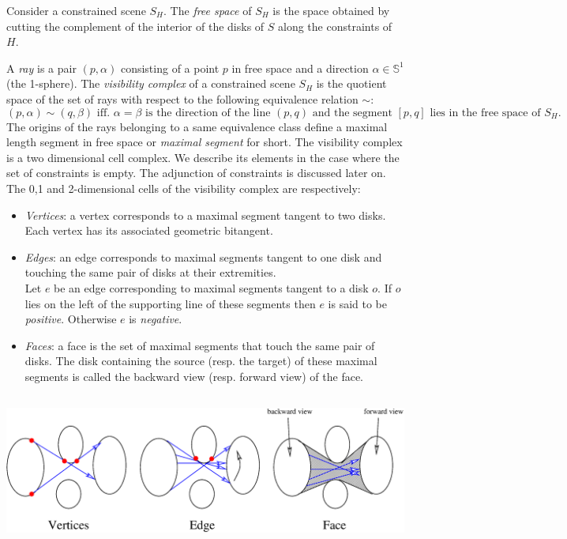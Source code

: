 Consider a constrained scene $S_H$. The \emph{free space} of $S_H$ is the
space obtained by cutting the complement of the interior of the disks of $S$
along the constraints of $H$.

A \emph{ray} is a pair $(p,\alpha)$ consisting of a point $p$ in free space and
a direction $\alpha \in \mathbb{S}^1$ (the 1-sphere).  The \emph{visibility
complex} of a constrained scene $S_H$ is the quotient space of the set of rays
with respect to the following equivalence relation $\sim$:
\begin{equation}
(p,\alpha) \sim (q,\beta) \textrm{ iff. } \alpha = \beta \textrm{ is the
direction of the line $(p,q)$ and the segment } [p,q] \textrm{ lies in the free
space of } S_H.
\end{equation}
The origins of the rays belonging to a same equivalence class define a maximal
length segment in free space or \emph{maximal segment} for short.  The
visibility complex is a two dimensional cell complex. We describe its elements
in the case where the set of constraints is empty. The adjunction of constraints
is discussed later on. The 0,1 and 2-dimensional cells of the visibility complex
are respectively:
\begin{itemize}
    \item \emph{Vertices}: a vertex corresponds to a maximal segment tangent to
    two disks. Each vertex has its associated geometric bitangent.
    \item \emph{Edges}: an edge corresponds to maximal segments tangent to one
    disk and touching the same pair of disks at their extremities. \\
    Let $e$ be an edge corresponding to maximal segments tangent to a disk $o$.
    If $o$ lies on the left of the supporting line of these segments then $e$ is
    said to be \emph{positive}. Otherwise $e$ is \emph{negative}.
    \item \emph{Faces}: a face is the set of maximal segments that touch the
    same pair of disks. The disk containing the source (resp. the target) of 
    these maximal segments is called the backward view (resp. forward view) of 
    the face.
\end{itemize}

\begin{ccTexOnly}
    \begin{center}
	\includegraphics[height=5cm,width=\linewidth]{fig/vis-complex.eps}%
    \end{center}
\end{ccTexOnly}

